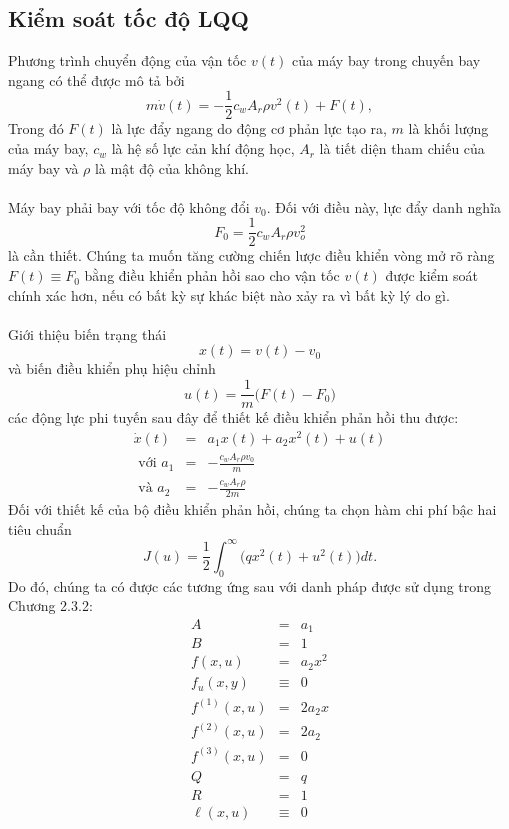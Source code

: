 \documentclass[12pt,a4paper]{report}
\begin{document}
\subsection{Kiểm soát tốc độ LQQ}
Phương trình chuyển động của vận tốc $v(t)$ của máy bay trong chuyến bay ngang có thể được mô tả bởi $$m\dot{v}(t) = -\frac{1}{2}c_wA_r\rho v^2(t) + F(t) ,$$ Trong đó $F(t)$ là lực đẩy ngang do động cơ phản lực tạo ra, $m$ là khối lượng của máy bay, $c_w$ là hệ số lực cản khí động học, $A_r$ là tiết diện tham chiếu của máy bay và $\rho$ là mật độ của không khí. \\\\Máy bay phải bay với tốc độ không đổi $v_0$. Đối với điều này, lực đẩy danh nghĩa $$F_0 = \frac{1}{2}c_wA_r\rho v_o^2$$ là cần thiết. Chúng ta muốn tăng cường chiến lược điều khiển vòng mở rõ ràng $F(t) \equiv F_0$ bằng điều khiển phản hồi sao cho vận tốc $v(t)$ được kiểm soát chính xác hơn, nếu có bất kỳ sự khác biệt nào xảy ra vì bất kỳ lý do gì. \\\\Giới thiệu biến trạng thái $$x(t) = v(t) - v_0$$ và biến điều khiển phụ hiệu chỉnh $$u(t) = \frac{1}{m}\big(F(t) - F_0\big)$$ các động lực phi tuyến sau đây để thiết kế điều khiển phản hồi thu được: \begin{eqnarray}
	\dot{x}(t) &=& a_1x(t) + a_2x^2(t) + u(t) \nonumber \\ \text{ với } a_1 &=& -\frac{c_wA_r\rho v_0}{m} \nonumber \\ \text{ và } a_2 &=& - \frac{c_wA_r\rho }{2m} \nonumber
\end{eqnarray} Đối với thiết kế của bộ điều khiển phản hồi, chúng ta chọn hàm chi phí bậc hai tiêu chuẩn $$J(u) = \frac{1}{2}\int_{0}^{\infty}\big(qx^2(t) + u^2(t)\big)dt.$$ Do đó, chúng ta có được các tương ứng sau với danh pháp được sử dụng trong Chương 2.3.2: \begin{eqnarray}
	A&=&a_1\nonumber\\B&=&1\nonumber\\f(x, u) &=& a_2x^2 \nonumber \\ f_u(x, y) &\equiv& 0 \nonumber \\ f^{(1)}(x, u) &=& 2a_2x \nonumber \\ f^{(2)}(x, u) &=& 2a_2 \nonumber \\ f^{(3)}(x, u) &=& 0 \nonumber \\ Q&=&q \nonumber \\R&=&1 \nonumber \\\ell(x, u) &\equiv& 0 \nonumber 
\end{eqnarray}
\end{document}

